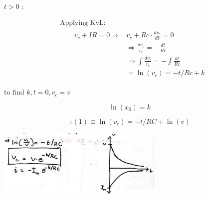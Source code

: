 \documentclass[12pt, a4paper]{article}
\newcommand{\figwidth}{8cm}
\begin{document}
$t>0$ :

$$
	\begin{aligned}
		 & \text { Applying KvL: }                                                                                                                         \\
		 & \qquad \begin{aligned}
			          v_{c}+I R=0 \Rightarrow & v_{c}+R c \cdot \frac{d v_{c}}{d t}=0                        \\
			                                  & \Rightarrow \frac{d v_{c}}{v_{c}}=-\frac{d t}{R c}           \\
			                                  & \Rightarrow \int \frac{d v_{c}}{v_{c}}=-\int \frac{d t}{R c} \\
			                                  & =\ln \left(v_{c}\right)=-t / R c+k
		          \end{aligned}
	\end{aligned}
$$

to find $k, t=0, v_{c}=v$

$$
	\ln \left(x_{0}\right)=k
$$

$$
	\therefore(1) \equiv \ln \left(v_{c}\right)=-t / R C+\ln (v)
$$

\begin{center}
	\includegraphics[max width=\figwidth]{2024_06_15_ae1c13e212c06c234cc4g-01.jpg}
\end{center}
\end{document}
